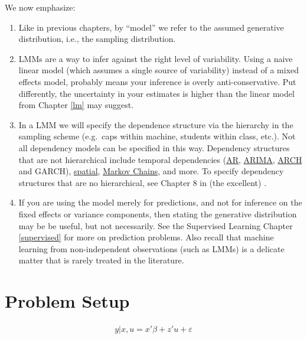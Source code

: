 \documentclass[]{book}
\theoremstyle{definition}
\theoremstyle{definition}
\theoremstyle{definition}
\theoremstyle{remark}
\begin{document}
We now emphasize:

\begin{enumerate}
\def\labelenumi{\arabic{enumi}.}
\item
  Like in previous chapters, by ``model'' we refer to the assumed
  generative distribution, i.e., the sampling distribution.
\item
  LMMs are a way to infer against the right level of variability. Using
  a naive linear model (which assumes a single source of variability)
  instead of a mixed effects model, probably means your inference is
  overly anti-conservative. Put differently, the uncertainty in your
  estimates is higher than the linear model from Chapter \ref{lm} may
  suggest.
\item
  In a LMM we will specify the dependence structure via the hierarchy in
  the sampling scheme (e.g.~caps within machine, students within class,
  etc.). Not all dependency models can be specified in this way.
  Dependency structures that are not hierarchical include temporal
  dependencies
  (\href{https://en.wikipedia.org/wiki/Autoregressive_model}{AR},
  \href{https://en.wikipedia.org/wiki/Autoregressive_integrated_moving_average}{ARIMA},
  \href{https://en.wikipedia.org/wiki/Autoregressive_conditional_heteroskedasticity}{ARCH}
  and GARCH),
  \href{https://en.wikipedia.org/wiki/Spatial_dependence}{spatial},
  \href{https://en.wikipedia.org/wiki/Markov_chain}{Markov Chains}, and
  more. To specify dependency structures that are no hierarchical, see
  Chapter 8 in (the excellent) \citet{weiss2005modeling}.
\item
  If you are using the model merely for predictions, and not for
  inference on the fixed effects or variance components, then stating
  the generative distribution may be be useful, but not necessarily. See
  the Supervised Learning Chapter \ref{supervised} for more on
  prediction problems. Also recall that machine learning from
  non-independent observations (such as LMMs) is a delicate matter that
  is rarely treated in the literature.
\end{enumerate}

\section{Problem Setup}\label{problem-setup-2}

\begin{align}
  y|x,u = x'\beta + z'u + \varepsilon
  \label{eq:mixed-model}  
\end{align}
\end{document}
